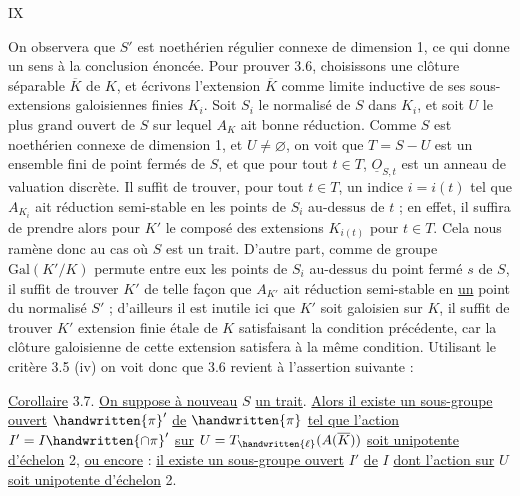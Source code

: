 \hfill IX

On observera que $S'$ est noethérien régulier connexe de dimension 1, ce qui donne un sens à la conclusion énoncée. Pour prouver 3.6, choisissons une clôture séparable $\overline{K}$ de $K$, et écrivons l'extension $\overline{K}$ comme limite inductive de ses sous-extensions galoisiennes finies $K_i$. Soit $S_i$ le normalisé de $S$ dans $K_i$, et soit $U$ le plus grand ouvert de $S$ sur lequel $A_K$ ait bonne réduction. Comme $S$ est noethérien connexe de dimension 1, et $U\ne\varnothing$, on voit que $T=S-U$ est un ensemble fini de point fermés de $S$, et que pour tout $t\in T$, $\underline{O}_{S,t}$ est un anneau de valuation discrète. Il suffit de trouver, pour tout $t\in T$, un indice $i=i(t)$ tel que $A_{K_i}$ ait réduction semi-stable en les points de $S_i$ au-dessus de $t$ ; en effet, il suffira de prendre alors pour $K'$ le composé des extensions $K_{i(t)}$ pour $t\in T$. Cela nous ramène donc au cas où $S$ est un trait. D'autre part, comme de groupe $\mathrm{Gal}(K'/K)$ permute entre eux les points de $S_i$ au-dessus du point fermé $s$ de $S$, il suffit de trouver $K'$ de telle façon que $A_{K'}$ ait réduction semi-stable en \uline{un} point du normalisé $S'$ ; d'ailleurs il est inutile ici que $K'$ soit galoisien sur $K$, il suffit de trouver $K'$ extension finie étale de $K$ satisfaisant la condition précédente, car la clôture galoisienne de cette extension satisfera à la même condition. Utilisant le critère 3.5 (iv) on voit donc que 3.6 revient à l'assertion suivante :

\uline{Corollaire} 3.7. \uline{On suppose à nouveau} $S$ \uline{un trait}. \uline{Alors il existe un sous-groupe ouvert} $\handwritten{\pi}'$ \uline{de} $\handwritten{\pi}$ \uline{tel que l'action} $I'=I\handwritten{\cap\pi}'$ \uline{sur} $U=T_{\handwritten{\ell}}(A(\overline{K}))$ \uline{soit unipotente d'échelon} 2, \uline{ou encore} : \uline{il existe un sous-groupe ouvert} $I'$ \uline{de} $I$ \uline{dont l'action sur} $U$ \uline{soit unipotente d'échelon} 2.

